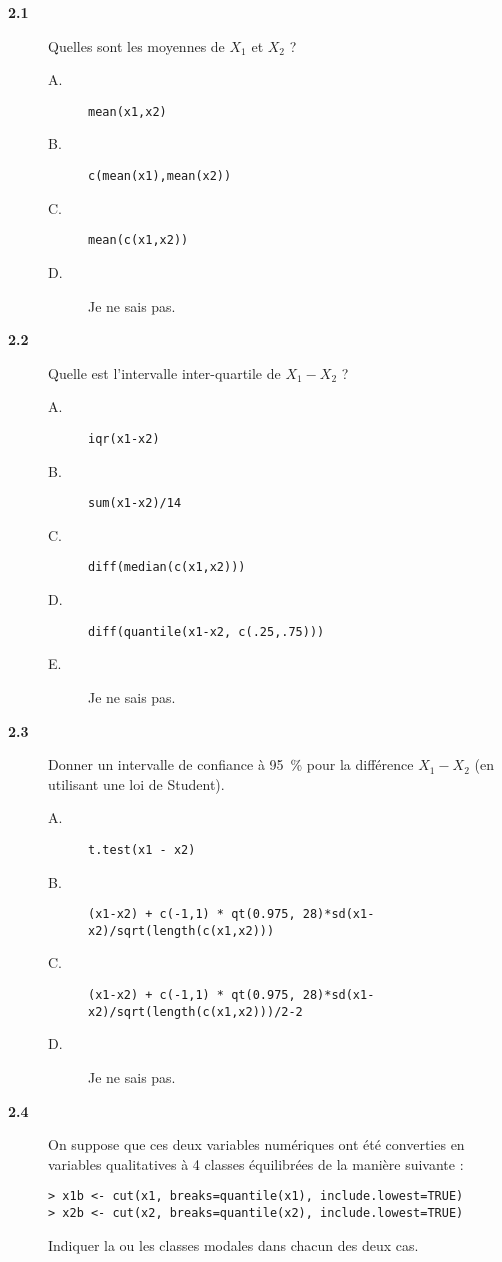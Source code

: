 \documentclass[11pt]{report}
\theoremstyle{definition}
\begin{document}
\begin{description}
\item[\bf 2.1]  Quelles sont les moyennes de $X_1$
  et $X_2$ ?  
  \begin{description}
  \item[A.] \verb|mean(x1,x2)|
  \item[B.] \verb|c(mean(x1),mean(x2))|
  \item[C.] \verb|mean(c(x1,x2))|
  \item[D.] Je ne sais pas.
  \end{description}
\item[\bf 2.2]  Quelle est l'intervalle
  inter-quartile de $X_1-X_2$ ?
  \begin{description}
  \item[A.] \verb|iqr(x1-x2)|
  \item[B.] \verb|sum(x1-x2)/14|
  \item[C.] \verb|diff(median(c(x1,x2)))|
  \item[D.] \verb|diff(quantile(x1-x2, c(.25,.75)))| 
  \item[E.] Je ne sais pas.
  \end{description}
\item[\bf 2.3]  Donner un intervalle de confiance à
  95~\% pour la différence $X_1-X_2$ (en utilisant une loi de Student).
  \begin{description}
  \item[A.] \verb|t.test(x1 - x2)|
  \item[B.] \verb|(x1-x2) + c(-1,1) * qt(0.975, 28)*sd(x1-x2)/sqrt(length(c(x1,x2)))|
  \item[C.] \verb|(x1-x2) + c(-1,1) * qt(0.975, 28)*sd(x1-x2)/sqrt(length(c(x1,x2)))/2-2|
  \item[D.] Je ne sais pas.
  \end{description}
\item[\bf 2.4]  On suppose que ces deux variables
  numériques ont été converties en variables qualitatives à 4 classes
  équilibrées de la manière suivante :
\begin{verbatim}
> x1b <- cut(x1, breaks=quantile(x1), include.lowest=TRUE)
> x2b <- cut(x2, breaks=quantile(x2), include.lowest=TRUE) 
\end{verbatim}  
  Indiquer la ou les classes modales dans chacun des deux cas. 
  \begin{description}

\end{description}
\end{description}
\end{document}
